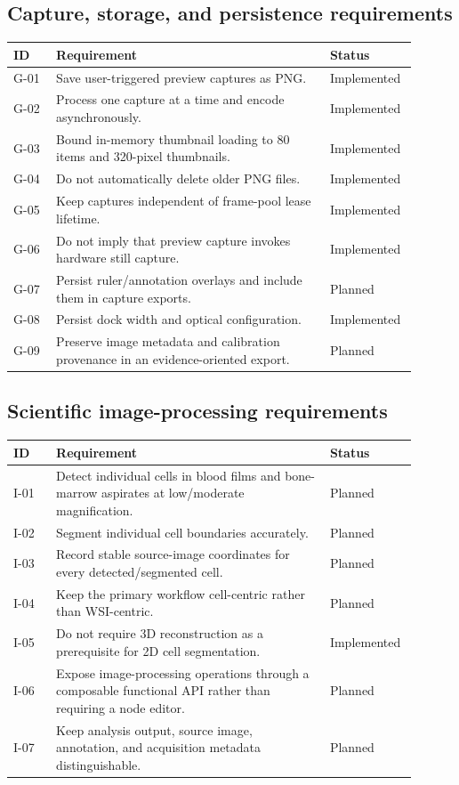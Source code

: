 \documentclass[11pt,a4paper,oneside]{article}
\newcommand{\implemented}{\textsf{Implemented}}
\newcommand{\planned}{\textsf{Planned}}
\begin{document}
\subsection{Capture, storage, and persistence requirements}
\begin{longtable}{p{0.10\linewidth}p{0.64\linewidth}p{0.16\linewidth}}
\toprule
ID & Requirement & Status\\
\midrule
G-01 & Save user-triggered preview captures as PNG. & \implemented\\
G-02 & Process one capture at a time and encode asynchronously. & \implemented\\
G-03 & Bound in-memory thumbnail loading to 80 items and 320-pixel thumbnails. & \implemented\\
G-04 & Do not automatically delete older PNG files. & \implemented\\
G-05 & Keep captures independent of frame-pool lease lifetime. & \implemented\\
G-06 & Do not imply that preview capture invokes hardware still capture. & \implemented\\
G-07 & Persist ruler/annotation overlays and include them in capture exports. & \planned\\
G-08 & Persist dock width and optical configuration. & \implemented\\
G-09 & Preserve image metadata and calibration provenance in an evidence-oriented export. & \planned\\
\bottomrule
\end{longtable}

\subsection{Scientific image-processing requirements}
\begin{longtable}{p{0.10\linewidth}p{0.64\linewidth}p{0.16\linewidth}}
\toprule
ID & Requirement & Status\\
\midrule
I-01 & Detect individual cells in blood films and bone-marrow aspirates at low/moderate magnification. & \planned\\
I-02 & Segment individual cell boundaries accurately. & \planned\\
I-03 & Record stable source-image coordinates for every detected/segmented cell. & \planned\\
I-04 & Keep the primary workflow cell-centric rather than WSI-centric. & \planned\\
I-05 & Do not require 3D reconstruction as a prerequisite for 2D cell segmentation. & \implemented\\
I-06 & Expose image-processing operations through a composable functional API rather than requiring a node editor. & \planned\\
I-07 & Keep analysis output, source image, annotation, and acquisition metadata distinguishable. & \planned\\
\bottomrule
\end{longtable}
\end{document}
